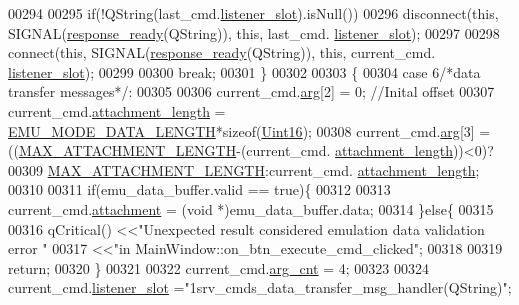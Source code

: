 \begin{DoxyCode}
00294 
00295             \textcolor{keywordflow}{if}(!QString(last\_cmd.\hyperlink{a00001_abb76d8edb39876deb60975c8fd784b3f}{listener\_slot}).isNull())
00296             disconnect(\textcolor{keyword}{this}, SIGNAL(\hyperlink{a00006_a3f6396874778799cf07a7a0149e54977}{response\_ready}(QString)), \textcolor{keyword}{this}, last\_cmd.
      \hyperlink{a00001_abb76d8edb39876deb60975c8fd784b3f}{listener\_slot});
00297 
00298             connect(\textcolor{keyword}{this}, SIGNAL(\hyperlink{a00006_a3f6396874778799cf07a7a0149e54977}{response\_ready}(QString)), \textcolor{keyword}{this}, current\_cmd.
      \hyperlink{a00001_abb76d8edb39876deb60975c8fd784b3f}{listener\_slot});
00299 
00300     \textcolor{keywordflow}{break};
00301 \}
00302 
00303 \{
00304     \textcolor{keywordflow}{case} 6\textcolor{comment}{/*data transfer messages*/}:
00305 
00306             current\_cmd.\hyperlink{a00001_a56e6c2d7315d0ae60a51e8b140c9cfe4}{arg}[2]              = 0; \textcolor{comment}{//Inital offset}
00307             current\_cmd.\hyperlink{a00001_ae5afad7c81dab7d9ab6587251aafdbf4}{attachment\_length}   = 
      \hyperlink{a00003_af4c3a8ad94feb4d7bda7f107f34baf41}{EMU\_MODE\_DATA\_LENGTH}*\textcolor{keyword}{sizeof}(\hyperlink{a00001_aae7407b021d43f7193a81a58cfb3e297}{Uint16});
00308             current\_cmd.\hyperlink{a00001_a56e6c2d7315d0ae60a51e8b140c9cfe4}{arg}[3]              = ((\hyperlink{a00031_aa8abe3a822c64813f7aaba3ca7e3db9c}{MAX\_ATTACHMENT\_LENGTH}-(current\_cmd.
      \hyperlink{a00001_ae5afad7c81dab7d9ab6587251aafdbf4}{attachment\_length}))<0)?
00309                                                \hyperlink{a00031_aa8abe3a822c64813f7aaba3ca7e3db9c}{MAX\_ATTACHMENT\_LENGTH}:current\_cmd.
      \hyperlink{a00001_ae5afad7c81dab7d9ab6587251aafdbf4}{attachment\_length};
00310 
00311             \textcolor{keywordflow}{if}(emu\_data\_buffer.valid == \textcolor{keyword}{true})\{
00312 
00313             current\_cmd.\hyperlink{a00001_a0b844fe783d7e252159a9641b949e83c}{attachment} = (\textcolor{keywordtype}{void} *)emu\_data\_buffer.data;
00314             \}\textcolor{keywordflow}{else}\{
00315 
00316                 qCritical() <<\textcolor{stringliteral}{"Unexpected result considered emulation data validation error "}
00317                             <<\textcolor{stringliteral}{"in MainWindow::on\_btn\_execute\_cmd\_clicked"};
00318 
00319             \textcolor{keywordflow}{return};
00320             \}
00321 
00322             current\_cmd.\hyperlink{a00001_affcea772a1bc5362ebbc274b6166f81b}{arg\_cnt}  = 4;
00323 
00324             current\_cmd.\hyperlink{a00001_abb76d8edb39876deb60975c8fd784b3f}{listener\_slot}   =\textcolor{stringliteral}{"1srv\_cmds\_data\_transfer\_msg\_handler(QString)"};

\end{DoxyCode}
